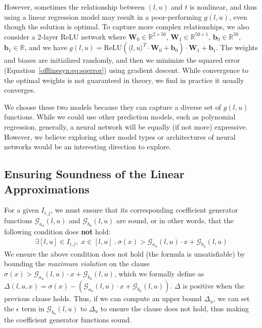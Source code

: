 However, sometimes the relationship between $ (l, u) $ and $ t $ is nonlinear,
and thus using a linear regression model may result in a poor-performing $ g(l,
u) $, even though the solution is optimal. To capture more complex
relationships, we also consider a 2-layer ReLU network where $
\mathbf{W}_0 \in \mathbb{R}^{2\times50} $, $ \mathbf{W}_1 \in
\mathbb{R}^{50\times1} $, $ \mathbf{b}_0 \in \mathbb{R}^{50} $, $ \mathbf{b}_1
\in \mathbb{R} $, and we have $ g(l, u) = \text{ReLU}(\langle l,u \rangle^T
\cdot \mathbf{W}_0 + \mathbf{b}_0) \cdot \mathbf{W}_1 + \mathbf{b}_1 $. The
weights and biases are initialized randomly, and then we minimize the
squared error (Equation~\ref{offlinesyn:eq:sqerror}) using gradient
descent. While convergence to the optimal weights is not guaranteed in
theory, we find in practice it usually converges.

We choose these two models because they can capture a diverse set of $ g(l , u) $ functions. While
we could use other prediction models, such as polynomial regression, generally, a neural
network will be equally (if not more) expressive. However, we believe exploring
other model types or architectures of neural networks would be an interesting
direction to explore.



\subsection{Ensuring Soundness of the Linear
Approximations}\label{offlinesyn:sec:soundness}
For a given $ I_{i, j} $, we must ensure that its corresponding coefficient
generator functions $ \mathcal{G}_{a_u}(l ,u)$ and $ \mathcal{G}_{b_u}(l ,u) $
are sound, or in other
words, that the following condition does \textbf{not} hold:
\begin{gather}\label{offlinesyn:eq:sound-opt}
\exists [l, u] \in I_{i, j}, \; x \in [l, u] ~.~
\sigma(x) > \mathcal{G}_{a_u}(l, u)\cdot x + \mathcal{G}_{b_u}(l, u)
\end{gather}
We ensure the above condition does not hold (the formula is unsatisfiable) by bounding the \textit{maximum violation} on
the clause $ \sigma(x) > \mathcal{G}_{a_u}(l, u)\cdot x + \mathcal{G}_{b_u}(l,
u) $,
which we formally define as
$ \Delta(l, u, x) =  \sigma(x) - (\mathcal{G}_{a_u}(l, u)\cdot x +
\mathcal{G}_{b_u}(l, u)) $. $ \Delta $ is
positive when the previous clause holds.  Thus, if we can compute an upper bound
$ \Delta_u $, we can set the $ \epsilon $ term in $ \mathcal{G}_{b_u}(l, u) $
to $ \Delta_u $
to ensure the clause does not hold, thus making the coefficient generator functions sound.

